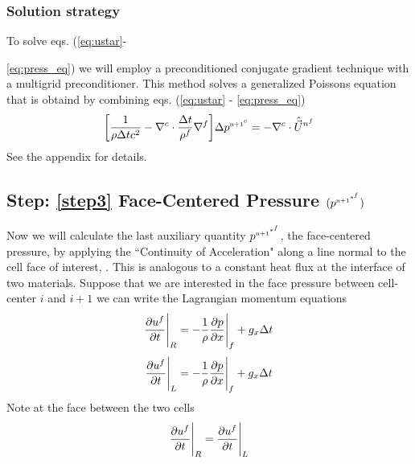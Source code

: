 \documentclass[fleqn]{article}
\begin{document}
\subsubsection*{Solution strategy}
To solve eqs. (\ref{eq:ustar}-{\ref{eq:press_eq}) we will employ a
preconditioned conjugate gradient technique with a multigrid preconditioner.
This method solves a generalized Poissons equation that is obtaind by
combining eqs. (\ref{eq:ustar} - \ref{eq:press_eq})
%
\begin{equation}
        \label{eq:delta_p_int}
        \biggl{[}\frac{ 1}{\rho \delt c^2} 
    -   \nabla^{c} \cdot \frac{\delt}{\rho^{f}}\nabla^{f} \biggr{]} \delpc       
    =   
    -   \nabla^{c} \cdot \hat{\vec{U}}^{{n}^f}   
\end{equation}
%
See the appendix for details. 
%
%
%
%
\subsection{Step: \ref{step3} \textsf{Face-Centered Pressure $(\pstar)$}}
Now we will calculate the last auxiliary quantity $\pstar$, the face-centered
pressure, by applying the ``Continuity of Acceleration" along a line normal
to the cell face of interest, .  This is analogous to
a constant heat flux at the interface of two materials.
Suppose that we are interested in the face pressure between cell-center $i$
and $i+1$ we can write the Lagrangian momentum equations
%
\begin{equation*}
    \pd{u^f}{t}\Bigg\vert_R = -\frac{1}{\rho}\pd{p}{x}\Bigg\vert_f + g_x \delt
\end{equation*}
%
\begin{equation*}
    \pd{u^f}{t}\Bigg\vert_L = -\frac{1}{\rho}\pd{p}{x}\Bigg\vert_f + g_x \delt
\end{equation*}
%
Note at the face between the two cells
\begin{equation}
    \label{eq:temp}
    \pd{u^f}{t}\Bigg\vert_R = \pd{u^f}{t}\Bigg\vert_L
\end{equation}
%

}
\end{document}

